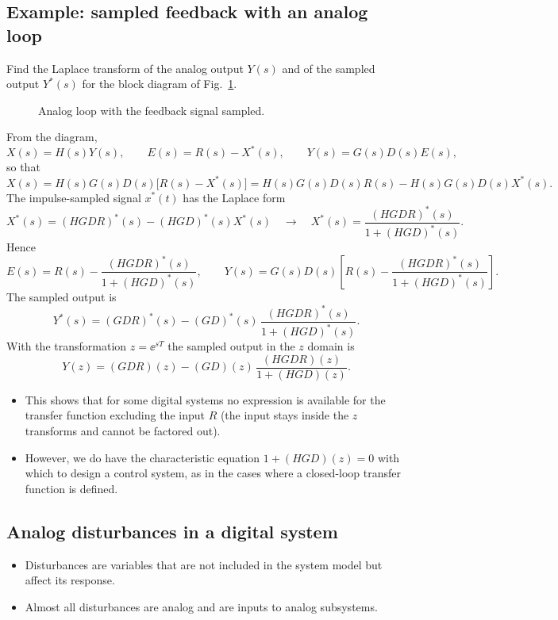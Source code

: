 \subsection{Example: sampled feedback with an analog loop}
\begin{example}
Find the Laplace transform of the analog output $Y(s)$ and of the sampled output $Y^{*}(s)$ for the
block diagram of Fig.~\ref{fig:sampledfb}.

\begin{figure}[H]
\centering
\resizebox{0.92\linewidth}{!}{\figSampledFeedback}
\caption{Analog loop with the feedback signal sampled.}\label{fig:sampledfb}
\end{figure}

\noindent From the diagram,
\[
  X(s)=H(s)Y(s),\qquad E(s)=R(s)-X^{*}(s),\qquad Y(s)=G(s)D(s)E(s),
\]
so that
\[
  X(s)=H(s)G(s)D(s)\bigl[R(s)-X^{*}(s)\bigr]=H(s)G(s)D(s)R(s)-H(s)G(s)D(s)X^{*}(s).
\]
The impulse-sampled signal $x^{*}(t)$ has the Laplace form
\[
  X^{*}(s)=(HGDR)^{*}(s)-(HGD)^{*}(s)X^{*}(s)\quad\longrightarrow\quad X^{*}(s)=\frac{(HGDR)^{*}(s)}{1+(HGD)^{*}(s)}.
\]
Hence
\[
  E(s)=R(s)-\frac{(HGDR)^{*}(s)}{1+(HGD)^{*}(s)},\qquad
  Y(s)=G(s)D(s)\left[R(s)-\frac{(HGDR)^{*}(s)}{1+(HGD)^{*}(s)}\right].
\]
The sampled output is
\[
  Y^{*}(s)=(GDR)^{*}(s)-(GD)^{*}(s)\,\frac{(HGDR)^{*}(s)}{1+(HGD)^{*}(s)}.
\]
With the transformation $z=\ee^{sT}$ the sampled output in the $z$ domain is
\[
  Y(z)=(GDR)(z)-(GD)(z)\,\frac{(HGDR)(z)}{1+(HGD)(z)}.
\]
\end{example}
\begin{itemize}
  \item This shows that for some digital systems no expression is available for the transfer function
        excluding the input $R$ (the input stays inside the $z$ transforms and cannot be factored out).
  \item However, we do have the characteristic equation $1+(HGD)(z)=0$ with which to design a control
        system, as in the cases where a closed-loop transfer function is defined.
\end{itemize}

\subsection{Analog disturbances in a digital system}
\begin{itemize}
  \item Disturbances are variables that are not included in the system model but affect its response.
  \item Almost all disturbances are analog and are inputs to analog subsystems.
\end{itemize}

